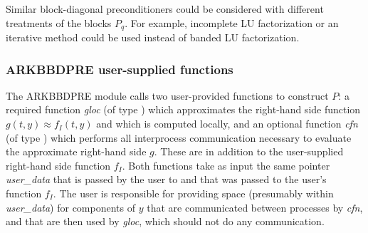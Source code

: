\documentclass[letterpaper,10pt,english]{sphinxmanual}
\begin{document}
Similar block-diagonal preconditioners could be considered with
different treatments of the blocks \(P_q\).  For example,
incomplete LU factorization or an iterative method could be used
instead of banded LU factorization.


\subsubsection{ARKBBDPRE user-supplied functions}
\label{c_interface/Preconditioners:arkbbdpre-user-supplied-functions}
The ARKBBDPRE module calls two user-provided functions to construct
\(P\): a required function \emph{gloc} (of type {\hyperref[c_interface/Preconditioners:c.ARKLocalFn]{\emph{}}})
which approximates the right-hand side function \(g(t,y) \approx
f_I(t,y)\) and which is computed locally, and an optional function
\emph{cfn} (of type {\hyperref[c_interface/Preconditioners:c.ARKCommFn]{\emph{}}}) which performs all interprocess
communication necessary to evaluate the approximate right-hand side
\(g\). These are in addition to the user-supplied right-hand side
function \(f_I\). Both functions take as input the same pointer
\emph{user\_data} that is passed by the user to
{\hyperref[c_interface/User_callable:c.ARKodeSetUserData]{\emph{}}} and that was passed to the user's
function \(f_I\). The user is responsible for providing space
(presumably within \emph{user\_data}) for components of \(y\) that are
communicated between processes by \emph{cfn}, and that are then used by
\emph{gloc}, which should not do any communication.
\end{document}
